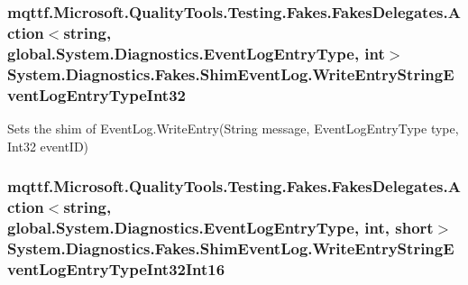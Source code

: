 \hypertarget{class_system_1_1_diagnostics_1_1_fakes_1_1_shim_event_log_a9d78f8df5d75276d5bc217512f8457ea}{
\subsubsection[{Write\-Entry\-String\-Event\-Log\-Entry\-Type\-Int32}]{\setlength{\rightskip}{0pt plus 5cm}mqttf.\-Microsoft.\-Quality\-Tools.\-Testing.\-Fakes.\-Fakes\-Delegates.\-Action$<$string, global.\-System.\-Diagnostics.\-Event\-Log\-Entry\-Type, int$>$ System.\-Diagnostics.\-Fakes.\-Shim\-Event\-Log.\-Write\-Entry\-String\-Event\-Log\-Entry\-Type\-Int32\hspace{0.3cm}{\ttfamily [set]}}}\label{class_system_1_1_diagnostics_1_1_fakes_1_1_shim_event_log_a9d78f8df5d75276d5bc217512f8457ea}


Sets the shim of Event\-Log.\-Write\-Entry(\-String message, Event\-Log\-Entry\-Type type, Int32 event\-I\-D)

\hypertarget{class_system_1_1_diagnostics_1_1_fakes_1_1_shim_event_log_ab207df1f6bf821f374b84a83e931aa1f}{
\subsubsection[{Write\-Entry\-String\-Event\-Log\-Entry\-Type\-Int32\-Int16}]{\setlength{\rightskip}{0pt plus 5cm}mqttf.\-Microsoft.\-Quality\-Tools.\-Testing.\-Fakes.\-Fakes\-Delegates.\-Action$<$string, global.\-System.\-Diagnostics.\-Event\-Log\-Entry\-Type, int, short$>$ System.\-Diagnostics.\-Fakes.\-Shim\-Event\-Log.\-Write\-Entry\-String\-Event\-Log\-Entry\-Type\-Int32\-Int16\hspace{0.3cm}{\ttfamily [set]}}}\label{class_system_1_1_diagnostics_1_1_fakes_1_1_shim_event_log_ab207df1f6bf821f374b84a83e931aa1f}


